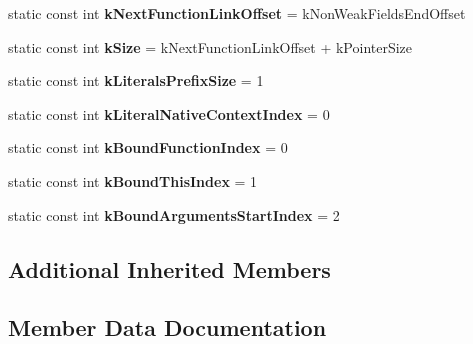 \begin{DoxyCompactItemize}
\item 
\hypertarget{classv8_1_1internal_1_1_j_s_function_a3b9c13402e2134ff257198c674897154}{}static const int {\bfseries k\+Next\+Function\+Link\+Offset} = k\+Non\+Weak\+Fields\+End\+Offset\label{classv8_1_1internal_1_1_j_s_function_a3b9c13402e2134ff257198c674897154}

\item 
\hypertarget{classv8_1_1internal_1_1_j_s_function_a808203d26f81e54fca0c7c039785fbfa}{}static const int {\bfseries k\+Size} = k\+Next\+Function\+Link\+Offset + k\+Pointer\+Size\label{classv8_1_1internal_1_1_j_s_function_a808203d26f81e54fca0c7c039785fbfa}

\item 
\hypertarget{classv8_1_1internal_1_1_j_s_function_a7543d546f61be559e649f10c05f7af28}{}static const int {\bfseries k\+Literals\+Prefix\+Size} = 1\label{classv8_1_1internal_1_1_j_s_function_a7543d546f61be559e649f10c05f7af28}

\item 
\hypertarget{classv8_1_1internal_1_1_j_s_function_a1e5fae933df0bed2a71429597bc814e2}{}static const int {\bfseries k\+Literal\+Native\+Context\+Index} = 0\label{classv8_1_1internal_1_1_j_s_function_a1e5fae933df0bed2a71429597bc814e2}

\item 
\hypertarget{classv8_1_1internal_1_1_j_s_function_a497b19c7b312dd1806afdc442581b474}{}static const int {\bfseries k\+Bound\+Function\+Index} = 0\label{classv8_1_1internal_1_1_j_s_function_a497b19c7b312dd1806afdc442581b474}

\item 
\hypertarget{classv8_1_1internal_1_1_j_s_function_a6c78261a527b35e2334bc292157b3b75}{}static const int {\bfseries k\+Bound\+This\+Index} = 1\label{classv8_1_1internal_1_1_j_s_function_a6c78261a527b35e2334bc292157b3b75}

\item 
\hypertarget{classv8_1_1internal_1_1_j_s_function_a847c9f09e6d2408a05f817cc828ac3c1}{}static const int {\bfseries k\+Bound\+Arguments\+Start\+Index} = 2\label{classv8_1_1internal_1_1_j_s_function_a847c9f09e6d2408a05f817cc828ac3c1}

\end{DoxyCompactItemize}
\subsection*{Additional Inherited Members}


\subsection{Member Data Documentation}
\hypertarget{classv8_1_1internal_1_1_j_s_function_afeab7ef9302f5f8506f76661d07b0a88}{}
